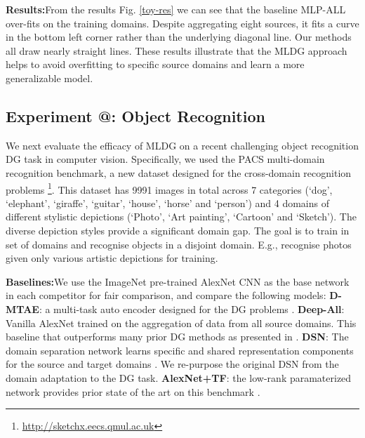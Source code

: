 \documentclass[letterpaper]{article} \usepackage{aaai18}  \usepackage{times}  \usepackage{helvet}  \usepackage{courier}  \usepackage{url}  \usepackage{graphicx}  \usepackage{amsmath}
\makeatletter
\newcommand*{\rom}[1]{\expandafter\@slowromancap\romannumeral #1@}
\makeatother
\begin{document}
{\vspace{0.1cm}\noindent \textbf{Results:}\quad From the results Fig. \ref{toy-res} we can see that the baseline MLP-ALL over-fits on the training domains.  Despite aggregating eight sources, it fits a curve in the bottom left corner rather than the underlying diagonal line. Our methods all draw nearly straight lines. 
These results illustrate that the MLDG approach helps to avoid overfitting to specific source domains and learn a more generalizable model.




\subsection{Experiment \rom{2}: Object Recognition}
We next evaluate the efficacy of MLDG on a recent challenging object recognition DG task in computer vision. Specifically, we used the PACS multi-domain recognition benchmark, a new dataset designed for the cross-domain recognition problems \cite{da2017dg}\footnote{\url{http://sketchx.eecs.qmul.ac.uk}}. This dataset has 9991 images in total across 7 categories (`dog', `elephant', `giraffe', `guitar', `house', `horse' and `person') and 4 domains of different stylistic depictions (`Photo', `Art painting', `Cartoon' and `Sketch'). The diverse depiction styles provide a significant domain gap. The goal is to train in set of domains and recognise objects in a disjoint domain. E.g., recognise photos given only various artistic depictions for training.



\vspace{0.1cm}\noindent \textbf{Baselines:}\quad We use the ImageNet pre-trained AlexNet CNN \cite{krizhevsky2012imagenetDeepCNN} as the base network in each competitor for fair comparison, and compare the following models: \textbf{D-MTAE}: a multi-task auto encoder designed for the DG problems \cite{ghifary2015domain}. \textbf{Deep-All}: Vanilla AlexNet trained on the aggregation of data from all source domains. This baseline that outperforms many prior DG methods as presented in  \cite{da2017dg}. 
\textbf{DSN}: The domain separation network learns specific and shared representation components for the source and target domains \cite{bousmalis2016domain}. We re-purpose the original DSN from the domain adaptation to the DG task. \textbf{AlexNet+TF}: the low-rank paramaterized network provides prior state of the art on this benchmark \cite{da2017dg}. 




}
\end{document}
